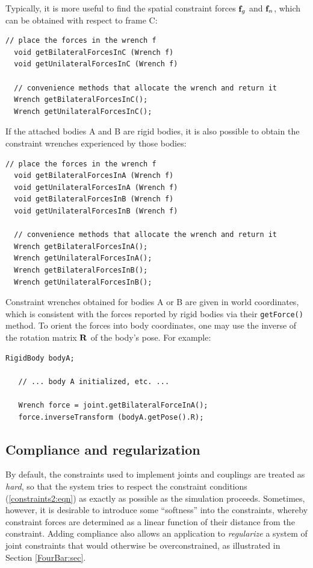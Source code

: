Typically, it is more useful to find the spatial constraint forces
${\bf f}_g$ and ${\bf f}_n$, which can be obtained with respect to frame C:
%
\begin{lstlisting}[]
  // place the forces in the wrench f
  void getBilateralForcesInC (Wrench f)
  void getUnilateralForcesInC (Wrench f)

  // convenience methods that allocate the wrench and return it
  Wrench getBilateralForcesInC();
  Wrench getUnilateralForcesInC();
\end{lstlisting}
%
If the attached bodies A and B are rigid bodies, it is also possible
to obtain the constraint wrenches experienced by those bodies:
%
\begin{lstlisting}[]
  // place the forces in the wrench f
  void getBilateralForcesInA (Wrench f)
  void getUnilateralForcesInA (Wrench f)
  void getBilateralForcesInB (Wrench f)
  void getUnilateralForcesInB (Wrench f)

  // convenience methods that allocate the wrench and return it
  Wrench getBilateralForcesInA();
  Wrench getUnilateralForcesInA();
  Wrench getBilateralForcesInB();
  Wrench getUnilateralForcesInB();
\end{lstlisting}
%
Constraint wrenches obtained for bodies A or B are given in world
coordinates, which is consistent with the forces reported by rigid
bodies via their {\tt getForce()} method. To orient the forces into
body coordinates, one may use the inverse of the rotation matrix ${\bf R}$
of the body's pose. For example:
%
\begin{lstlisting}[]
   RigidBody bodyA;

   // ... body A initialized, etc. ...

   Wrench force = joint.getBilateralForceInA();
   force.inverseTransform (bodyA.getPose().R);
\end{lstlisting}
%

\subsection{Compliance and regularization}
\label{JointCompliance:sec}

By default, the constraints used to implement joints and couplings are
treated as {\it hard}, so that the system tries to respect the
constraint conditions (\ref{constraints2:eqn}) as exactly as possible
as the simulation proceeds.  Sometimes, however, it is desirable to
introduce some ``softness'' into the constraints, whereby constraint
forces are determined as a linear function of their distance from the
constraint. Adding compliance also allows an application to {\it
regularize} a system of joint constraints that would otherwise be
overconstrained, as illustrated in Section \ref{FourBar:sec}.

